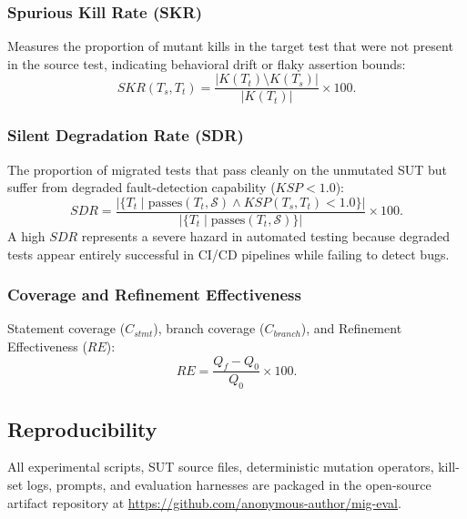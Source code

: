 \documentclass[pdflatex,sn-mathphys-num]{sn-jnl}
\begin{document}
\subsubsection{Spurious Kill Rate (SKR)}
Measures the proportion of mutant kills in the target test that were not present in the source test, indicating behavioral drift or flaky assertion bounds:
\begin{equation}
    SKR(T_s, T_t) = \frac{|K(T_t) \setminus K(T_s)|}{|K(T_t)|} \times 100.
\end{equation}

\subsubsection{Silent Degradation Rate (SDR)}
The proportion of migrated tests that pass cleanly on the unmutated SUT but suffer from degraded fault-detection capability ($KSP < 1.0$):
\begin{equation}
    SDR = \frac{|\{T_t \mid \text{passes}(T_t, \mathcal{S}) \land KSP(T_s, T_t) < 1.0\}|}{|\{T_t \mid \text{passes}(T_t, \mathcal{S})\}|} \times 100.
\end{equation}
A high $SDR$ represents a severe hazard in automated testing because degraded tests appear entirely successful in CI/CD pipelines while failing to detect bugs.

\subsubsection{Coverage and Refinement Effectiveness}
Statement coverage ($C_{stmt}$), branch coverage ($C_{branch}$), and Refinement Effectiveness ($RE$):
\begin{equation}
    RE = \frac{Q_f - Q_0}{Q_0} \times 100.
\end{equation}

\subsection{Reproducibility}
\label{subsec:reproducibility}

All experimental scripts, SUT source files, deterministic mutation operators,
kill-set logs, prompts, and evaluation harnesses are packaged in the open-source
artifact repository at \url{https://github.com/anonymous-author/mig-eval}.

\end{document}
